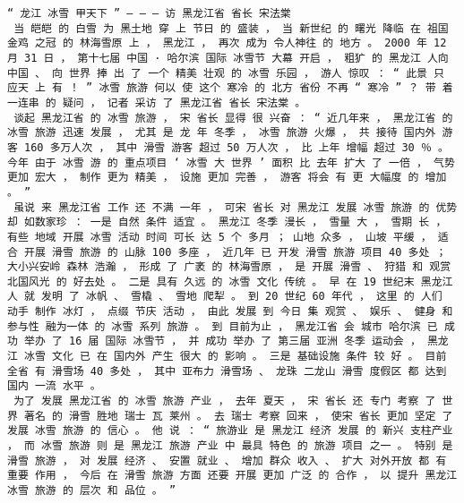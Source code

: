 \documentclass{article}
\begin{document}
\begin{Verbatim}[commandchars=\\\{\}]
 “ 龙江 冰雪 甲天下 ” — — — 访 黑龙江省 省长 宋法棠 
 当 皑皑 的 白雪 为 黑土地 穿 上 节日 的 盛装 ， 当 新世纪 的 曙光 降临 在 祖国 金鸡 之冠 的 林海雪原 上 ， 黑龙江 ， 再次 成为 令人神往 的 地方 。 2000 年 12 月 31 日 ， 第十七届 中国 · 哈尔滨 国际 冰雪节 大幕 开启 ， 粗犷 的 黑龙江 人向 中国 、 向 世界 捧 出 了 一个 精美 壮观 的 冰雪 乐园 ， 游人 惊叹 ： “ 此景 只 应天 上 有 ！ ” 冰雪 旅游 何以 使 这个 寒冷 的 北方 省份 不再 “ 寒冷 ” ？ 带 着 一连串 的 疑问 ， 记者 采访 了 黑龙江省 省长 宋法棠 。 
 谈起 黑龙江省 的 冰雪 旅游 ， 宋 省长 显得 很 兴奋 ： “ 近几年来 ， 黑龙江省 的 冰雪 旅游 迅速 发展 ， 尤其 是 龙 年 冬季 ， 冰雪 旅游 火爆 ， 共 接待 国内外 游客 160 多万人次 ， 其中 滑雪 游客 超过 50 万人次 ， 比 上年 增幅 超过 30 ％ 。 今年 由于 冰雪 游 的 重点项目 ‘ 冰雪 大 世界 ’ 面积 比 去年 扩大 了 一倍 ， 气势 更加 宏大 ， 制作 更为 精美 ， 设施 更加 完善 ， 游客 将会 有 更 大幅度 的 增加 。 ” 
 虽说 来 黑龙江省 工作 还 不满 一年 ， 可宋 省长 对 黑龙江 发展 冰雪 旅游 的 优势 却 如数家珍 ： 一是 自然 条件 适宜 。 黑龙江 冬季 漫长 ， 雪量 大 ， 雪期 长 ， 有些 地域 开展 冰雪 活动 时间 可长 达 5 个 多月 ； 山地 众多 ， 山坡 平缓 ， 适合 开展 滑雪 旅游 的 山脉 100 多座 ， 近几年 已 开发 滑雪 旅游 项目 40 多处 ； 大小兴安岭 森林 浩瀚 ， 形成 了 广袤 的 林海雪原 ， 是 开展 滑雪 、 狩猎 和 观赏 北国风光 的 好去处 。 二是 具有 久远 的 冰雪 文化 传统 。 早 在 19 世纪末 黑龙江 人 就 发明 了 冰帆 、 雪橇 、 雪地 爬犁 。 到 20 世纪 60 年代 ， 这里 的 人们 动手 制作 冰灯 ， 点缀 节庆 活动 ， 由此 发展 到 今日 集 观赏 、 娱乐 、 健身 和 参与性 融为一体 的 冰雪 系列 旅游 。 到 目前为止 ， 黑龙江省 会 城市 哈尔滨 已 成功 举办 了 16 届 国际 冰雪节 ， 并 成功 举办 了 第三届 亚洲 冬季 运动会 ， 黑龙江 冰雪 文化 已 在 国内外 产生 很大 的 影响 。 三是 基础设施 条件 较 好 。 目前 全省 有 滑雪场 40 多处 ， 其中 亚布力 滑雪场 、 龙珠 二龙山 滑雪 度假区 都 达到 国内 一流 水平 。 
 为了 发展 黑龙江省 的 冰雪 旅游 产业 ， 去年 夏天 ， 宋 省长 还 专门 考察 了 世界 著名 的 滑雪 胜地 瑞士 瓦 莱州 。 去 瑞士 考察 回来 ， 使宋 省长 更加 坚定 了 发展 冰雪 旅游 的 信心 。 他 说 ： “ 旅游业 是 黑龙江 经济 发展 的 新兴 支柱产业 ， 而 冰雪 旅游 则 是 黑龙江 旅游 产业 中 最具 特色 的 旅游 项目 之一 。 特别 是 滑雪 旅游 ， 对 发展 经济 、 安置 就业 、 增加 群众 收入 、 扩大 对外开放 都 有 重要 作用 ， 今后 在 滑雪 旅游 方面 还要 开展 更加 广泛 的 合作 ， 以 提升 黑龙江 冰雪 旅游 的 层次 和 品位 。 ” 

\end{Verbatim}
\end{document}
